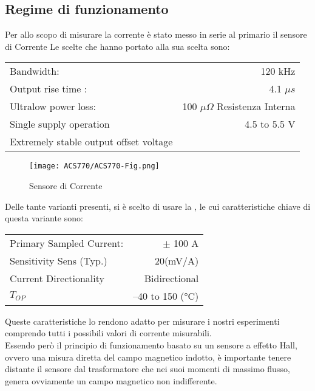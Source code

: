 \subsection{Regime di funzionamento}
Per allo scopo di misurare la corrente è stato messo in serie al primario il sensore di Corrente \cite{ACS770}
Le scelte che hanno portato alla sua scelta sono: \vspace{-8mm}
\begin{center}
	\begin{tabular}[t]{|l r|}
		\hline
		Bandwidth:                             & 120 kHz                               \\
		Output rise time :                     & 4.1 $ \mu s $                         \\
		Ultralow power loss:                   & 100 $ \mu \Omega $ Resistenza Interna \\
		Single supply operation                & 4.5 to 5.5 V                          \\
		Extremely stable output offset voltage &                                       \\
		\hline
	\end{tabular}
\end{center}

\begin{figure}[h]
	\centering
	\texttt{[image: ACS770/ACS770-Fig.png]}
	\caption[Sensore di Corrente ]{Sensore di Corrente}
\end{figure}


\noindent
Delle tante varianti presenti, si è scelto di usare la , le cui caratteristiche chiave di questa variante sono:
\begin{center}
	\begin{tabular}[t]{|l r|}
		\hline
		Primary Sampled Current: & $\pm$ 100 A     \\
		Sensitivity Sens (Typ.)  & 20(mV/A)        \\
		Current Directionality   & Bidirectional   \\
		$T_{OP}$                 & –40 to 150 (°C) \\
		\hline
	\end{tabular}
\end{center}

\noindent
Queste caratteristiche lo rendono adatto per misurare i nostri esperimenti comprendo tutti i possibili valori di corrente misurabili.\\
Essendo però il principio di funzionamento basato su un sensore a effetto Hall, ovvero una misura diretta del campo magnetico indotto, è importante tenere distante il sensore dal trasformatore che nei suoi momenti di massimo flusso, genera ovviamente un campo magnetico non indifferente.

